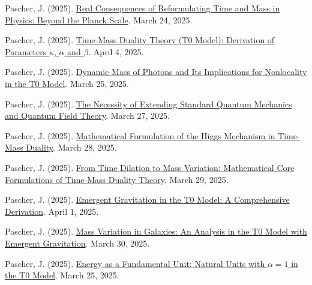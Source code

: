 \documentclass[a4paper,12pt]{article}
\begin{document}
\begin{thebibliography}{99}
		 Pascher, J. (2025). \href{https://github.com/jpascher/T0-Time-Mass-Duality/tree/main/2/pdf/English/JenseitsPlanckEn.pdf}{Real Consequences of Reformulating Time and Mass in Physics: Beyond the Planck Scale}. March 24, 2025.
		
		 Pascher, J. (2025). \href{https://github.com/jpascher/T0-Time-Mass-Duality/tree/main/2/pdf/English/ZeitMasseT0ParamsEn.pdf}{Time-Mass Duality Theory (T0 Model): Derivation of Parameters \(\kappa\), \(\alpha\) and \(\beta\)}. April 4, 2025.
		
		 Pascher, J. (2025). \href{https://github.com/jpascher/T0-Time-Mass-Duality/tree/main/2/pdf/English/DynMassePhotonenNichtlokalEn.pdf}{Dynamic Mass of Photons and Its Implications for Nonlocality in the T0 Model}. March 25, 2025.
		
		 Pascher, J. (2025). \href{https://github.com/jpascher/T0-Time-Mass-Duality/tree/main/2/pdf/English/NotwendigkeitQMErweiterungEn.pdf}{The Necessity of Extending Standard Quantum Mechanics and Quantum Field Theory}. March 27, 2025.
		
		 Pascher, J. (2025). \href{https://github.com/jpascher/T0-Time-Mass-Duality/tree/main/2/pdf/English/MathHiggsZeitMasseEn.pdf}{Mathematical Formulation of the Higgs Mechanism in Time-Mass Duality}. March 28, 2025.
		
		 Pascher, J. (2025). \href{https://github.com/jpascher/T0-Time-Mass-Duality/tree/main/2/pdf/English/MathZeitMasseLagrangeEn.pdf}{From Time Dilation to Mass Variation: Mathematical Core Formulations of Time-Mass Duality Theory}. March 29, 2025.
		
		 Pascher, J. (2025). \href{https://github.com/jpascher/T0-Time-Mass-Duality/tree/main/2/pdf/English/EmergentGravT0En.pdf}{Emergent Gravitation in the T0 Model: A Comprehensive Derivation}. April 1, 2025.
		
		 Pascher, J. (2025). \href{https://github.com/jpascher/T0-Time-Mass-Duality/tree/main/2/pdf/English/MassVarGalaxienEn.pdf}{Mass Variation in Galaxies: An Analysis in the T0 Model with Emergent Gravitation}. March 30, 2025.
		
		 Pascher, J. (2025). \href{https://github.com/jpascher/T0-Time-Mass-Duality/tree/main/2/pdf/English/NatEinheitenAlpha1En.pdf}{Energy as a Fundamental Unit: Natural Units with \(\alpha = 1\) in the T0 Model}. March 25, 2025.
		

\end{thebibliography}
\end{document}
